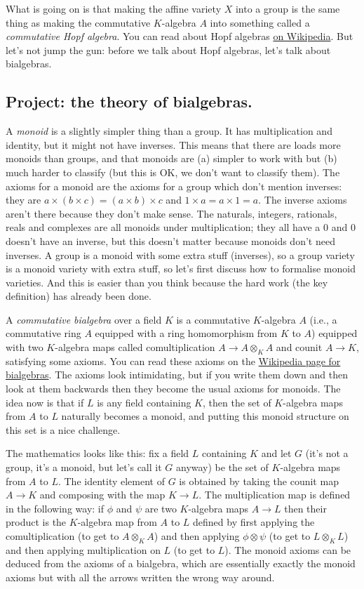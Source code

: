 \documentclass{amsart}
\begin{document}
What is going on is that making the affine variety $X$ into a group is the same thing as making the commutative $K$-algebra $A$ into something called a \emph{commutative Hopf algebra}. You can read about Hopf algebras \href{https://en.wikipedia.org/wiki/Hopf_algebra}{on Wikipedia}. But let's not jump the gun: before we talk about Hopf algebras, let's talk about bialgebras.

\subsection{Project: the theory of bialgebras.}

A \emph{monoid} is a slightly simpler thing than a group. It has multiplication and identity, but it might not have inverses. This means that there are loads more monoids than groups, and that monoids are (a) simpler to work with but (b) much harder to classify (but this is OK, we don't want to classify them). The axioms for a monoid are the axioms for a group which don't mention inverses: they are $a\times(b\times c)=(a\times b)\times c$ and $1\times a=a\times 1=a$. The inverse axioms aren't there because they don't make sense. The naturals, integers, rationals, reals and complexes are all monoids under multiplication; they all have a 0 and 0 doesn't have an inverse, but this doesn't matter because monoids don't need inverses. A group is a monoid with some extra stuff (inverses), so a group variety is a monoid variety with extra stuff, so let's first discuss how to formalise monoid varieties. And this is easier than you think because the hard work (the key definition) has already been done.

A \emph{commutative bialgebra} over a field $K$ is a commutative $K$-algebra $A$ (i.e., a commutative ring $A$ equipped with a ring homomorphism from $K$ to $A$) equipped with two $K$-algebra maps called comultiplication $A\to A \otimes_KA$ and counit $A\to K$, satisfying some axioms. You can read these axioms on the \href{https://en.wikipedia.org/wiki/Bialgebra}{Wikipedia page for bialgebras}. The axioms look intimidating, but if you write them down and then look at them backwards then they become the usual axioms for monoids. The idea now is that if $L$ is any field containing $K$, then the set of $K$-algebra maps from $A$ to $L$ naturally becomes a monoid, and putting this monoid structure on this set is a nice challenge.

The mathematics looks like this: fix a field $L$ containing $K$ and let $G$ (it's not a group, it's a monoid, but let's call it $G$ anyway) be the set of $K$-algebra maps from $A$ to $L$. The identity element of $G$ is obtained by taking the counit map $A\to K$ and composing with the map $K\to L$. The multiplication map is defined in the following way: if $\phi$ and $\psi$ are two $K$-algebra maps $A\to L$ then their product is the $K$-algebra map from $A$ to $L$ defined by first applying the comultiplication (to get to $A\otimes_K A$) and then applying $\phi\otimes\psi$ (to get to $L\otimes_K L$) and then applying multiplication on $L$ (to get to $L$). The monoid axioms can be deduced from the axioms of a bialgebra, which are essentially exactly the monoid axioms but with all the arrows written the wrong way around.
\end{document}
